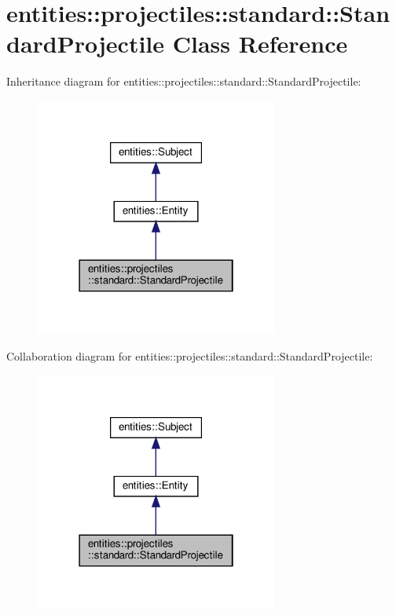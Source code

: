 \hypertarget{classentities_1_1projectiles_1_1standard_1_1StandardProjectile}{}\section{entities\+:\+:projectiles\+:\+:standard\+:\+:Standard\+Projectile Class Reference}
\label{classentities_1_1projectiles_1_1standard_1_1StandardProjectile}


Inheritance diagram for entities\+:\+:projectiles\+:\+:standard\+:\+:Standard\+Projectile\+:\nopagebreak
\begin{figure}[H]
\begin{center}
\leavevmode
\includegraphics[width=226pt]{classentities_1_1projectiles_1_1standard_1_1StandardProjectile__inherit__graph}
\end{center}
\end{figure}


Collaboration diagram for entities\+:\+:projectiles\+:\+:standard\+:\+:Standard\+Projectile\+:\nopagebreak
\begin{figure}[H]
\begin{center}
\leavevmode
\includegraphics[width=226pt]{classentities_1_1projectiles_1_1standard_1_1StandardProjectile__coll__graph}
\end{center}
\end{figure}
